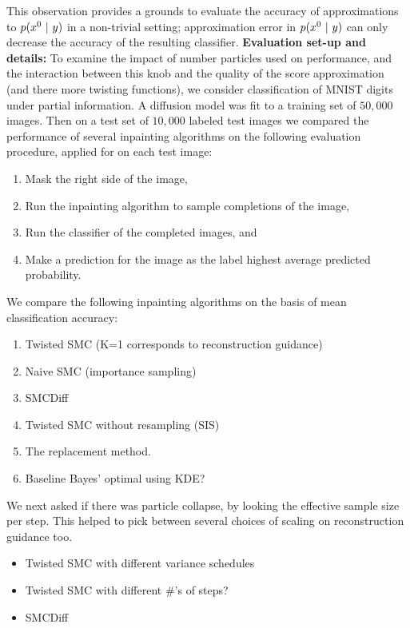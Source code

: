 This observation provides a grounds to evaluate the accuracy of approximations to $p(x^{0} ~\vert~ y)$ in a non-trivial setting;
approximation error in $p(x^{0} ~\vert~ y)$ can only decrease the accuracy of the resulting classifier.
\textbf{Evaluation set-up and details:}
To examine the impact of number particles used on performance,
and the interaction between this knob and the quality of the score approximation (and there more twisting functions),
we consider classification of MNIST digits under partial information.
A diffusion model was fit to a training set of $50,000$ images.
Then on a test set of $10,000$ labeled test images we compared the performance of several inpainting algorithms on the following evaluation procedure, applied for on each test image:
\begin{enumerate}
    \item{Mask the right side of the image,}
    \item{Run the inpainting algorithm to sample completions of the image,}
    \item{Run the classifier of the completed images, and}
    \item{Make a prediction for the image as the label highest average predicted probability.}
\end{enumerate}
We compare the following inpainting algorithms on the basis of mean classification accuracy:
\begin{enumerate}
    \item{Twisted SMC (K=1 corresponds to reconstruction guidance)}
    \item{Naive SMC (importance sampling)}
    \item{SMCDiff}
    \item{Twisted SMC without resampling (SIS)}
    \item{The replacement method.}
    \item{Baseline Bayes' optimal using KDE?}
\end{enumerate}


We next asked if there was particle collapse, by looking the effective sample size per step.
This helped to pick between several choices of scaling on reconstruction guidance too.
\begin{itemize}
    \item{Twisted SMC with different variance schedules}
    \item{Twisted SMC with different \#'s of steps?}
    \item{SMCDiff}
\end{itemize}


\fi 


